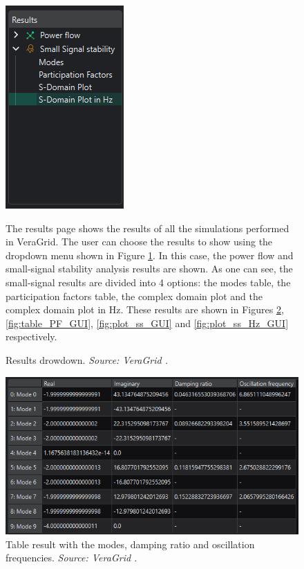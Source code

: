 \begin{figure}[H]
  \centering
  \begin{minipage}{0.45\textwidth}
    \centering
    \includegraphics[width=0.5\linewidth]{figures/results_desplegable_GUI.png}
    \caption{Results drowdown. \textit{Source: VeraGrid \cite{veragrid}.}}
    \label{fig:results_dropdown_GUI}
  \end{minipage}
  \hfill
  \begin{minipage}{0.5\textwidth}
    The results page shows the results of all the simulations performed in VeraGrid. The user can choose the results to show
    using the dropdown menu shown in Figure \ref{fig:results_dropdown_GUI}. In this case, the power flow and small-signal stability
     analysis results are shown. As one can see, the small-signal results are divided into 4 options: the modes table, the participation
     factors table, the complex domain plot and the complex domain plot in Hz. These results are shown in Figures \ref{fig:table_modes_GUI},
     \ref{fig:table_PF_GUI}, \ref{fig:plot_ss_GUI} and \ref{fig:plot_ss_Hz_GUI} respectively.
  \end{minipage}
\end{figure}

\begin{figure}[H]
  \centering
  \includegraphics[width=0.8\linewidth]{figures/result_modes_ss_GUI.png}
  \caption{Table result with the modes, damping ratio and oscillation frequencies. \textit{Source: VeraGrid \cite{veragrid}.}}
  \label{fig:table_modes_GUI}
\end{figure}

